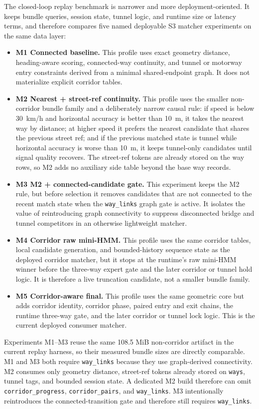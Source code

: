 \documentclass{article}
\begin{document}
The closed-loop replay benchmark is narrower and more deployment-oriented. It keeps bundle queries, session state, tunnel logic, and runtime size or latency terms, and therefore compares five named deployable S3 matcher experiments on the same data layer:
\begin{itemize}
\item \textbf{M1 Connected baseline.} This profile uses exact geometry distance, heading-aware scoring, connected-way continuity, and tunnel or motorway entry constraints derived from a minimal shared-endpoint graph. It does not materialize explicit corridor tables.
\item \textbf{M2 Nearest + street-ref continuity.} This profile uses the smaller non-corridor bundle family and a deliberately narrow causal rule: if speed is below \SI{30}{km/h} and horizontal accuracy is better than \SI{10}{m}, it takes the nearest way by distance; at higher speed it prefers the nearest candidate that shares the previous street ref; and if the previous matched state is tunnel while horizontal accuracy is worse than \SI{10}{m}, it keeps tunnel-only candidates until signal quality recovers. The street-ref tokens are already stored on the way rows, so M2 adds no auxiliary side table beyond the base way records.
\item \textbf{M3 M2 + connected-candidate gate.} This experiment keeps the M2 rule, but before selection it removes candidates that are not connected to the recent match state when the \texttt{way\_links} graph gate is active. It isolates the value of reintroducing graph connectivity to suppress disconnected bridge and tunnel competitors in an otherwise lightweight matcher.
\item \textbf{M4 Corridor raw mini-HMM.} This profile uses the same corridor tables, local candidate generation, and bounded-history sequence state as the deployed corridor matcher, but it stops at the runtime's raw mini-HMM winner before the three-way expert gate and the later corridor or tunnel hold logic. It is therefore a live truncation candidate, not a smaller bundle family.
\item \textbf{M5 Corridor-aware final.} This profile uses the same geometric core but adds corridor identity, corridor phase, paired entry and exit chains, the runtime three-way gate, and the later corridor or tunnel lock logic. This is the current deployed consumer matcher.
\end{itemize}

Experiments M1--M3 reuse the same 108.5 MiB non-corridor artifact in the current replay harness, so their measured bundle sizes are directly comparable. M1 and M3 both require \texttt{way\_links} because they use graph-derived connectivity. M2 consumes only geometry distance, street-ref tokens already stored on \texttt{ways}, tunnel tags, and bounded session state. A dedicated M2 build therefore can omit \texttt{corridor\_progress}, \texttt{corridor\_pairs}, and \texttt{way\_links}. M3 intentionally reintroduces the connected-transition gate and therefore still requires \texttt{way\_links}.
\end{document}

